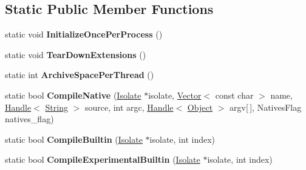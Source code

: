 \subsection*{Static Public Member Functions}
\begin{DoxyCompactItemize}
\item 
static void {\bfseries Initialize\+Once\+Per\+Process} ()\hypertarget{classv8_1_1internal_1_1_bootstrapper_aebe5e8b735f78ccb34cdc57bd6af4167}{}\label{classv8_1_1internal_1_1_bootstrapper_aebe5e8b735f78ccb34cdc57bd6af4167}

\item 
static void {\bfseries Tear\+Down\+Extensions} ()\hypertarget{classv8_1_1internal_1_1_bootstrapper_a07307f7e4952c28bdd597e3839ea8d28}{}\label{classv8_1_1internal_1_1_bootstrapper_a07307f7e4952c28bdd597e3839ea8d28}

\item 
static int {\bfseries Archive\+Space\+Per\+Thread} ()\hypertarget{classv8_1_1internal_1_1_bootstrapper_af55e132f4a17a18aceb087688aea0291}{}\label{classv8_1_1internal_1_1_bootstrapper_af55e132f4a17a18aceb087688aea0291}

\item 
static bool {\bfseries Compile\+Native} (\hyperlink{classv8_1_1internal_1_1_isolate}{Isolate} $\ast$isolate, \hyperlink{classv8_1_1internal_1_1_vector}{Vector}$<$ const char $>$ name, \hyperlink{classv8_1_1internal_1_1_handle}{Handle}$<$ \hyperlink{classv8_1_1internal_1_1_string}{String} $>$ source, int argc, \hyperlink{classv8_1_1internal_1_1_handle}{Handle}$<$ \hyperlink{classv8_1_1internal_1_1_object}{Object} $>$ argv\mbox{[}$\,$\mbox{]}, Natives\+Flag natives\+\_\+flag)\hypertarget{classv8_1_1internal_1_1_bootstrapper_ad79d369195f8e8e2a2dde472096566d3}{}\label{classv8_1_1internal_1_1_bootstrapper_ad79d369195f8e8e2a2dde472096566d3}

\item 
static bool {\bfseries Compile\+Builtin} (\hyperlink{classv8_1_1internal_1_1_isolate}{Isolate} $\ast$isolate, int index)\hypertarget{classv8_1_1internal_1_1_bootstrapper_a27be91672eb777b32c1432922da06ed3}{}\label{classv8_1_1internal_1_1_bootstrapper_a27be91672eb777b32c1432922da06ed3}

\item 
static bool {\bfseries Compile\+Experimental\+Builtin} (\hyperlink{classv8_1_1internal_1_1_isolate}{Isolate} $\ast$isolate, int index)\hypertarget{classv8_1_1internal_1_1_bootstrapper_a5f04103e962ea9c999039541f0805416}{}\label{classv8_1_1internal_1_1_bootstrapper_a5f04103e962ea9c999039541f0805416}


\end{DoxyCompactItemize}
